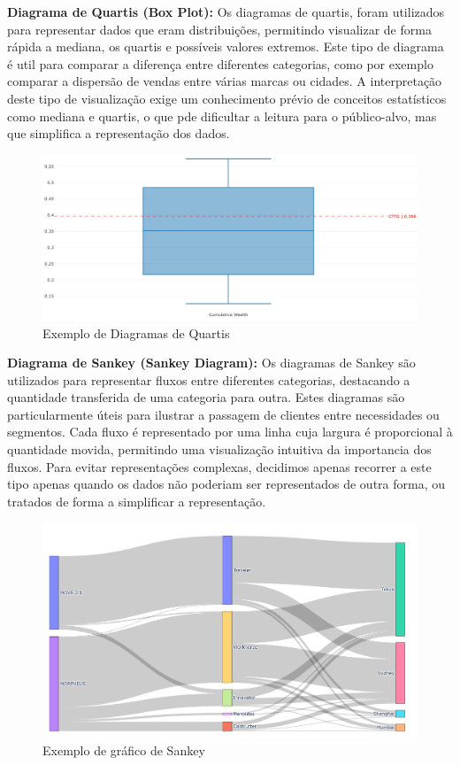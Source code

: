 \textbf{Diagrama de Quartis (Box Plot):}
Os diagramas de quartis, foram utilizados para representar dados que eram distribuições, permitindo visualizar de forma rápida a mediana, os quartis e possíveis valores extremos. Este tipo de diagrama é util para comparar a diferença entre diferentes categorias, como por exemplo comparar a dispersão de vendas entre várias marcas ou cidades. A interpretação deste tipo de visualização exige um conhecimento prévio de conceitos estatísticos como mediana e quartis, o que pde dificultar a leitura para o público-alvo, mas que simplifica a representação dos dados.

\begin{figure}[H]
    \centering
    \includegraphics[max width=12cm, keepaspectratio]{./img/box}
    \caption{Exemplo de Diagramas de Quartis}
\end{figure}
\noindent

\textbf{Diagrama de Sankey (Sankey Diagram):}
Os diagramas de Sankey são utilizados para representar fluxos entre diferentes categorias, destacando a quantidade transferida de uma categoria para outra. Estes diagramas são particularmente úteis para ilustrar a passagem de clientes entre necessidades ou segmentos. Cada fluxo é representado por uma linha cuja largura é proporcional à quantidade movida, permitindo uma visualização intuitiva da importancia dos fluxos. Para evitar representações complexas, decidimos apenas recorrer a este tipo apenas quando os dados não poderiam ser representados de outra forma, ou tratados de forma a simplificar a representação.

\begin{figure}[H]
    \centering
    \includegraphics[max width=12cm, keepaspectratio]{./img/skankey}
    \caption{Exemplo de gráfico de Sankey}
\end{figure}
\noindent

